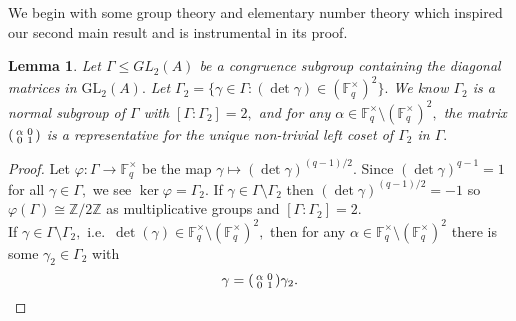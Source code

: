 \documentclass[11pt]{amsart}
\newtheorem{lemma}[theorem]{Lemma}
\newtheorem{corollary}[theorem]{Corollary}
\theoremstyle{definition}
\newenvironment{psmallmatrix}
{\left(\begin{smallmatrix}}
	{\end{smallmatrix}\right)}
\numberwithin{equation}{section}
\newcommand{\GL}{\mathrm{GL}} 	%
\newcommand{\bbF}{\mathbb{F}}		%
\newcommand{\bbZ}{\mathbb{Z}}		%
\begin{document}
		We begin with some group theory and elementary number theory which inspired our second main result and is instrumental in its proof.
		\begin{lemma}\label{l: Gamma2 normal, index 2, coset rep}
			Let $\Gamma \leq GL_2(A)$ be a congruence subgroup containing the diagonal matrices in $\GL_2(A).$ Let $\Gamma_2=\{\gamma\in \Gamma: (\det \gamma)\in (\bbF_q^{\times})^2 \}.$ We know $\Gamma_2$ is a normal subgroup of $\Gamma$ with $[\Gamma:\Gamma_2]=2,$ and for any $\alpha\in \bbF_q^{\times}\setminus(\bbF_q^{\times})^2,$ the matrix $\begin{psmallmatrix}\alpha&0\\0&1\end{psmallmatrix}$ is a representative for the unique non-trivial left coset of $\Gamma_2$ in $\Gamma.$
		\end{lemma}
		\begin{proof}
			Let $\varphi:\Gamma\to \bbF_q^{\times}$ be the map $\gamma\mapsto (\det\gamma)^{(q-1)/2}.$ Since $(\det\gamma)^{q-1}=1$ for all $\gamma\in \Gamma,$ we see $\ker\varphi=\Gamma_2.$ If $\gamma\in \Gamma\setminus\Gamma_2$ then $(\det\gamma)^{(q-1)/2}= -1$ so $\varphi(\Gamma)\cong \bbZ/2\bbZ$ as multiplicative groups and $[\Gamma:\Gamma_2]=2.$\\
			
			If $\gamma\in \Gamma\setminus \Gamma_2,$ i.e.\ $\det(\gamma)\in \bbF_q^{\times}\setminus(\bbF_q^{\times})^2,$ then for any $\alpha\in \bbF_q^{\times}\setminus(\bbF_q^{\times})^2$ there is some $\gamma_2\in \Gamma_2$ with 
			\[\gamma=\begin{psmallmatrix}\alpha&0\\0&1\end{psmallmatrix}\gamma_2.\]
		\end{proof}
		
		
\end{document}
